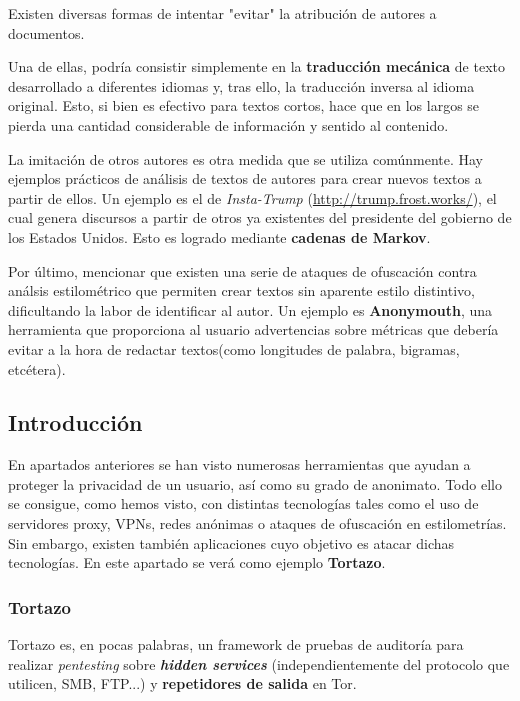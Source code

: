 Existen diversas formas de intentar "evitar" la atribución de autores a documentos. 

Una de ellas, podría consistir simplemente en la \textbf{traducción mecánica} de texto desarrollado a diferentes idiomas y, tras ello, la traducción inversa al idioma original. Esto, si bien es efectivo para textos cortos, hace que en los largos se pierda una cantidad considerable de información y sentido al contenido.

La imitación de otros autores es otra medida que se utiliza comúnmente. Hay ejemplos prácticos de análisis de textos de autores para crear nuevos textos a partir de ellos. Un ejemplo es el de \textit{Insta-Trump} (\url{http://trump.frost.works/}), el cual genera discursos a partir de otros ya existentes del presidente del gobierno de los Estados Unidos. Esto es logrado mediante \textbf{cadenas de Markov}.

Por último, mencionar que existen una serie de ataques de ofuscación contra análsis estilométrico que permiten crear textos sin aparente estilo distintivo, dificultando la labor de identificar al autor.
Un ejemplo es \textbf{Anonymouth}, una herramienta que proporciona al usuario advertencias sobre métricas que debería evitar a la hora de redactar textos(como longitudes de palabra, bigramas, etcétera).

 \label{sec:identificacion}
\subsection{Introducción}

En apartados anteriores se han visto numerosas herramientas que ayudan a proteger la privacidad de un usuario, así como su grado de anonimato. Todo ello se consigue, como hemos visto, con distintas tecnologías tales como el uso de servidores proxy, VPNs, redes anónimas o ataques de ofuscación en estilometrías. 
Sin embargo, existen también aplicaciones cuyo objetivo es atacar dichas tecnologías. En este apartado se verá como ejemplo \textbf{Tortazo}.

\subsubsection{Tortazo}
Tortazo es, en pocas palabras, un framework de pruebas de auditoría para realizar \textit{pentesting} sobre \textit{\textbf{hidden services}} (independientemente del protocolo que utilicen, SMB, FTP...) y \textbf{repetidores de salida} en Tor.

